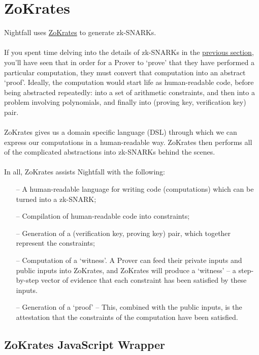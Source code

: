 \documentclass{article}
\begin{document}
\section{ZoKrates}
\label{sec:zokrates}
Nightfall uses \href{https://github.com/Zokrates/ZoKrates}{ZoKrates} to generate zk-SNARKs.\\
\\
If you spent time delving into the details of zk-SNARKs in the \hyperref[sec:zkSnarks]{previous section}, you'll have seen that in order for a Prover to `prove' that they have performed a particular computation, they must convert that computation into an abstract `proof'. Ideally, the computation would start life as human-readable code, before being abstracted repeatedly: into a set of arithmetic constraints, and then into a problem involving polynomials, and finally into (proving key, verification key) pair.\\
\\
ZoKrates gives us a domain specific language (DSL) through which we can express our computations in a human-readable way. ZoKrates then performs all of the complicated abstractions into zk-SNARKs behind the scenes.\\
\\
In all, ZoKrates assists Nightfall with the following:
\begin{itemize} \itemsep-0.5em
  \item[--] A human-readable language for writing code (computations) which can be turned into a zk-SNARK;
  \item[--] Compilation of human-readable code into constraints;
  \item[--] Generation of a (verification key, proving key) pair, which together represent the constraints;
  \item[--] Computation of a `witness'. A Prover can feed their private inputs and public inputs into ZoKrates, and ZoKrates will produce a `witness' -- a step-by-step vector of evidence that each constraint has been satisfied by these inputs.
  \item[--] Generation of a `proof' -- This, combined with the public inputs, is the attestation that the constraints of the computation have been satisfied.
\end{itemize}

\subsection{ZoKrates JavaScript Wrapper}
\label{sec:zokratesJavascriptWrapper}
\end{document}
